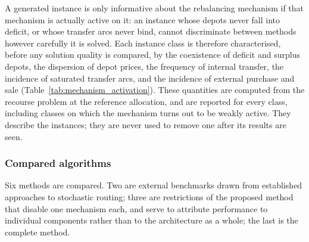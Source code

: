 \documentclass[authoryear,final,3p,times]{elsarticle}
\theoremstyle{definition}
\theoremstyle{plain}
\begin{document}
A generated instance is only informative about the rebalancing mechanism if
that mechanism is actually active on it: an instance whose depots never fall into
deficit, or whose transfer arcs never bind, cannot discriminate between
methods however carefully it is solved.  Each instance class is therefore
characterised, before any solution quality is compared, by the coexistence of
deficit and surplus depots, the dispersion of depot prices, the frequency of
internal transfer, the incidence of saturated transfer arcs, and the
incidence of external purchase and sale (Table~\ref{tab:mechanism_activation}).
These quantities are computed from the recourse problem at the reference
allocation, and are reported for every class, including classes on which the
mechanism turns out to be weakly active.  They describe the instances; they
are never used to remove one after its results are seen.

\begin{table}[!htbp]
\centering
\caption{Mechanism-activation diagnostics by pre-specified instance class.}
\label{tab:mechanism_activation}
\end{table}

\subsubsection{Compared algorithms}
\label{subsubsec:algorithms_compared}

Six methods are compared.  Two are external benchmarks drawn from established
approaches to stochastic routing; three are restrictions of the proposed
method that disable one mechanism each, and serve to attribute performance to
individual components rather than to the architecture as a whole; the last is
the complete method.
\end{document}
